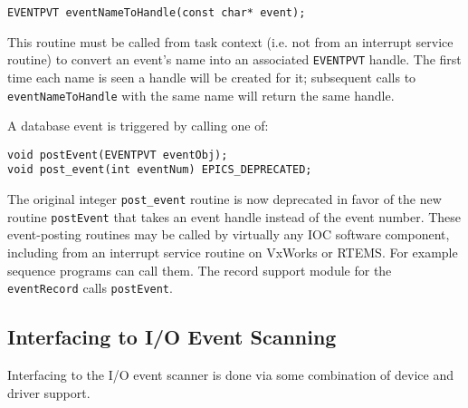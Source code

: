 \begin{verbatim}
EVENTPVT eventNameToHandle(const char* event);
\end{verbatim}

This routine must be called from task context (i.e. not from an interrupt service routine) to convert an event's name into an associated \verb|EVENTPVT| handle.
The first time each name is seen a handle will be created for it; subsequent calls to \verb|eventNameToHandle| with the same name will return the same handle.

A database event is triggered by calling one of:

\begin{verbatim}
void postEvent(EVENTPVT eventObj);
void post_event(int eventNum) EPICS_DEPRECATED;
\end{verbatim}

The original integer \verb|post_event| routine is now deprecated in favor of the new routine \verb|postEvent| that takes an event handle instead of the event number.
These event-posting routines may be called by virtually any IOC software component, including from an interrupt service routine on VxWorks or RTEMS.
For example sequence programs can call them.
The record support module for the \verb|eventRecord| calls \verb|postEvent|.

\subsection{Interfacing to I/O Event Scanning}


Interfacing to the I/O event scanner is done via some combination of device and driver support.

